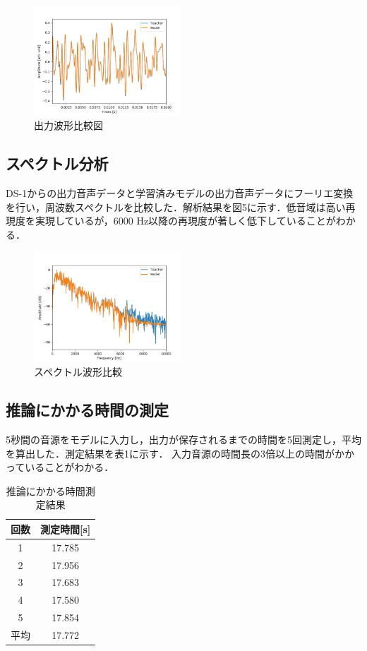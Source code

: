 \documentclass{jarticle}
\begin{document}
\begin{figure}[htbp]
 \begin{center}
  \includegraphics[width=55mm]{gain5_output_hikaku.png}
 \end{center}
 \caption{出力波形比較図}
 \label{fig:one}
\end{figure}

\newpage
\subsection{スペクトル分析}
DS-1からの出力音声データと学習済みモデルの出力音声データにフーリエ変換を行い，周波数スペクトルを比較した．解析結果を図5に示す．低音域は高い再現度を実現しているが，6000 Hz以降の再現度が著しく低下していることがわかる．

\begin{figure}[htbp]
 \begin{center}
  \includegraphics[width=55mm]{gain5_fft_hikaku.png}
 \end{center}
 \caption{スペクトル波形比較}
 \label{fig:one}
\end{figure}

\subsection{推論にかかる時間の測定}

5秒間の音源をモデルに入力し，出力が保存されるまでの時間を5回測定し，平均を算出した．測定結果を表1に示す．
入力音源の時間長の3倍以上の時間がかかっていることがわかる．

\begin{table}[htbp]
  \begin{center}
  \caption{推論にかかる時間測定結果}
  \begin{tabular}{c|c} \hline
    回数&測定時間[s]\\ \hline
    1&17.785 \\
    2&17.956 \\
    3&17.683 \\
    4&17.580 \\
    5&17.854 \\ \hline
    平均&17.772\\ \hline
  \end{tabular}
  \end{center}
\end{table}
\end{document}
